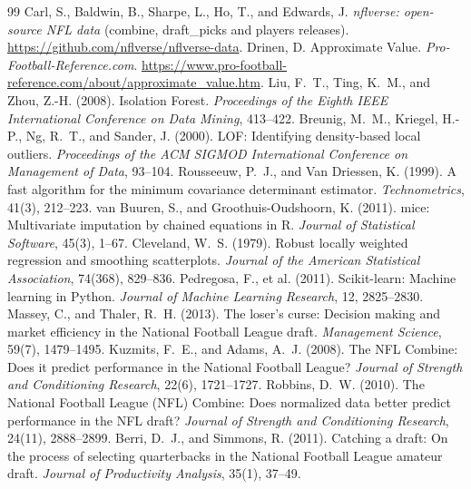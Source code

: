 \documentclass[11pt]{article}
\begin{document}
\begin{thebibliography}{99}\footnotesize\setlength{\itemsep}{1pt}
 Carl, S., Baldwin, B., Sharpe, L., Ho, T., and Edwards, J. \emph{nflverse: open-source NFL data} (combine, draft\_picks and players releases). \url{https://github.com/nflverse/nflverse-data}.
 Drinen, D. Approximate Value. \emph{Pro-Football-Reference.com}. \url{https://www.pro-football-reference.com/about/approximate_value.htm}.
 Liu, F.~T., Ting, K.~M., and Zhou, Z.-H. (2008). Isolation Forest. \emph{Proceedings of the Eighth IEEE International Conference on Data Mining}, 413--422.
 Breunig, M.~M., Kriegel, H.-P., Ng, R.~T., and Sander, J. (2000). LOF: Identifying density-based local outliers. \emph{Proceedings of the ACM SIGMOD International Conference on Management of Data}, 93--104.
 Rousseeuw, P.~J., and Van Driessen, K. (1999). A fast algorithm for the minimum covariance determinant estimator. \emph{Technometrics}, 41(3), 212--223.
 van Buuren, S., and Groothuis-Oudshoorn, K. (2011). mice: Multivariate imputation by chained equations in R. \emph{Journal of Statistical Software}, 45(3), 1--67.
 Cleveland, W.~S. (1979). Robust locally weighted regression and smoothing scatterplots. \emph{Journal of the American Statistical Association}, 74(368), 829--836.
 Pedregosa, F., et al. (2011). Scikit-learn: Machine learning in Python. \emph{Journal of Machine Learning Research}, 12, 2825--2830.
 Massey, C., and Thaler, R.~H. (2013). The loser's curse: Decision making and market efficiency in the National Football League draft. \emph{Management Science}, 59(7), 1479--1495.
 Kuzmits, F.~E., and Adams, A.~J. (2008). The NFL Combine: Does it predict performance in the National Football League? \emph{Journal of Strength and Conditioning Research}, 22(6), 1721--1727.
 Robbins, D.~W. (2010). The National Football League (NFL) Combine: Does normalized data better predict performance in the NFL draft? \emph{Journal of Strength and Conditioning Research}, 24(11), 2888--2899.
 Berri, D.~J., and Simmons, R. (2011). Catching a draft: On the process of selecting quarterbacks in the National Football League amateur draft. \emph{Journal of Productivity Analysis}, 35(1), 37--49.
\end{thebibliography}
\end{document}
